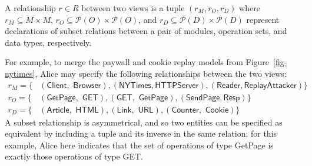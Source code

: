 \begin{defn} A relationship $r \in R$ between two views is a tuple
  $(r_{M}, r_{O}, r_{D})$ where $r_{M} \subseteq M \times M$, $r_{O}
  \subseteq \mathcal P (O) \times \mathcal P (O)$, and $r_{D}
  \subseteq \mathcal P (D) \times \mathcal P (D)$ represent
  declarations of subset relations between a pair of modules,
  operation sets, and data types, respectively.
\end{defn}
For example, to merge the paywall and cookie replay models from
Figure~\ref{fig-nytimes}, Alice may specify the following
relationships between the two views:
\begin{align*}
  r_{M} = \{&(\textsf{Client$,$ Browser}),(\textsf{NYTimes$,$
    HTTPServer}), (\textsf{Reader$,$
    ReplayAttacker})\} \\
  r_{O} = \{&(\textsf{GetPage$,$ GET}), (\textsf{GET$,$ GetPage}),
  (\textsf{SendPage$,$
    Resp})\}\\
  r_{D} = \{&(\textsf{Article$,$ HTML}),(\textsf{Link$,$ URL}),
  (\textsf{Counter$,$ Cookie})\}
\end{align*}
A subset relationship is asymmetrical, and so two entities can be
specified as equivalent by including a tuple and its inverse in the
same relation; for this example, Alice here indicates that the
set of operations of type \textsf{GetPage} is exactly those
operations of type \textsf{GET}.


